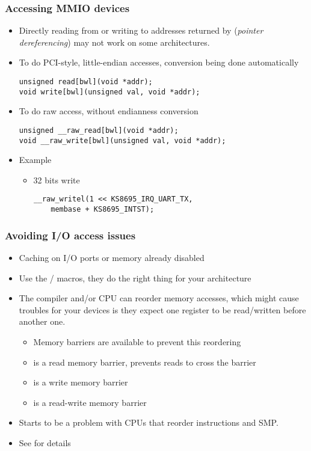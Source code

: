 \begin{frame}[fragile]
  \frametitle{Accessing MMIO devices}
  \begin{itemize}
  \item Directly reading from or writing to addresses returned by
     (\emph{pointer dereferencing}) may not work on some
    architectures.
  \item To do PCI-style, little-endian accesses, conversion being done
    automatically
\begin{verbatim}
unsigned read[bwl](void *addr);
void write[bwl](unsigned val, void *addr);
\end{verbatim}
  \item To do raw access, without endianness conversion
\begin{verbatim}
unsigned __raw_read[bwl](void *addr);
void __raw_write[bwl](unsigned val, void *addr);
\end{verbatim}
  \item Example
    \begin{itemize}
    \item 32 bits write
\begin{verbatim}
__raw_writel(1 << KS8695_IRQ_UART_TX,
    membase + KS8695_INTST);
\end{verbatim}
    \end{itemize}
  \end{itemize}
\end{frame}

\begin{frame}
  \frametitle{Avoiding I/O access issues}
  \begin{itemize}
  \item Caching on I/O ports or memory already disabled
  \item Use the / macros,
        they do the right thing for your architecture
  \item The compiler and/or CPU can reorder memory accesses, which
    might cause troubles for your devices is they expect one register
    to be read/written before another one.
    \begin{itemize}
    \item Memory barriers are available to prevent this reordering
    \item {} is a read memory barrier, prevents reads to
      cross the barrier
    \item {} is a write memory barrier
    \item {} is a read-write memory barrier
    \end{itemize}
  \item Starts to be a problem with CPUs that reorder instructions and
    SMP.
  \item See  for details
  \end{itemize}
\end{frame}

